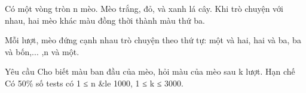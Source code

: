 Có một vòng tròn n mèo. Mèo trắng, đỏ, và xanh lá cây. Khi trò chuyện với nhau, hai mèo khác màu đồng thời thành màu thứ ba.

Mỗi lượt, mèo đứng cạnh nhau trò chuyện theo thứ tự: một và hai, hai và ba, ba và bốn,... ,n và một.

Yêu cầu
Cho biết màu ban đầu của mèo, hỏi màu của mèo sau k lượt.
Hạn chế
Có 50\% số tests có 1 ≤ n \&le 1000, 1 ≤ k ≤ 3000.
